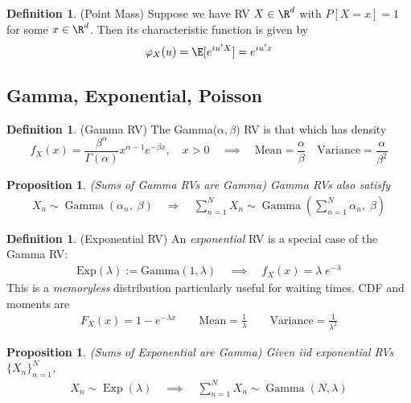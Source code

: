\documentclass[12pt]{article}
\theoremstyle{plain}
\newtheorem{prop}[thm]{Proposition}
\theoremstyle{definition}
\newtheorem{defn}[thm]{Definition}
\theoremstyle{remark}
\newcommand{\sumnN}{\sum^N_{n=1}}
\newcommand{\nN}{_{n=1}^N}
\begin{document}
\begin{defn}(Point Mass)
Suppose we have RV $X\in\R^d$ with $P[X=x]=1$ for some $x\in\R^d$.
Then its characteristic function is given by
\begin{align*}
  \varphi_X(u)
  = \E[e^{iu'X}] = e^{iu'x}
\end{align*}
\end{defn}


\subsection{Gamma, Exponential, Poisson}

\begin{defn}(Gamma RV)
The Gamma($\alpha,\beta$) RV is that which has density
\begin{equation}
   f_X(x) = \frac{\beta^\alpha}{\Gamma(\alpha)} x^{\alpha-1}
    e^{-\beta x}, \quad x > 0
    \quad\implies\quad
    \text{Mean} = \frac{\alpha}{\beta}
    \quad
    \text{Variance} = \frac{\alpha}{\beta^2}
\end{equation}
\end{defn}

\begin{prop}\emph{(Sums of Gamma RVs are Gamma)}
Gamma RVs also satisfy
\begin{align*}
  X_n \sim \operatorname{Gamma}(\alpha_n, \;\beta)
  \quad \Rightarrow \quad
   \sumnN X_n \sim
   \operatorname{Gamma}\left(\sumnN \alpha_n,\;\beta \right)
\end{align*}
\end{prop}

\begin{defn}(Exponential RV)
An \emph{exponential} RV is a special case of the Gamma RV:
\begin{align*}
  \text{Exp}(\lambda)
  :=
  \text{Gamma}(1,\lambda)
  \quad\implies\quad
  f_X(x) = \lambda\; e^{-\lambda}
\end{align*}
This is a \emph{memoryless} distribution particularly useful for
waiting times.
CDF and moments are
\begin{align*}
  F_X(x)
  = 1 - e^{-\lambda x}
  \qquad
  \text{Mean} = \frac{1}{\lambda}
  \qquad
  \text{Variance} = \frac{1}{\lambda^2}
\end{align*}
\end{defn}

\begin{prop}\emph{(Sums of Exponential are Gamma)}
Given iid exponential RVs $\{X_n\}\nN$,
\begin{align*}
  X_n \sim \operatorname{Exp}(\lambda)
  \quad\implies\quad
  \sumnN X_n \sim \operatorname{Gamma}(N, \lambda)
\end{align*}
\end{prop}
\end{document}
